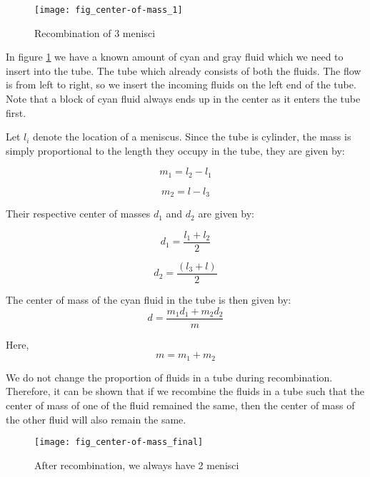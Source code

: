 	\begin{figure}[H]
		\centering
		\texttt{[image: fig\_center-of-mass\_1]}
		\caption{Recombination of 3 menisci}
		\label{fig_center-of-mass_1}
	\end{figure}
	
	In figure \ref{fig_center-of-mass_1} we have a known amount of cyan and gray fluid which we need to insert into the tube. The tube which already consists of both the fluids. The flow is from left to right, so we insert the incoming fluids on the left end of the tube. Note that a block of cyan fluid always ends up in the center as it enters the tube first.
	
	Let $l_{i}$ denote the location of a meniscus. Since the tube is cylinder, the mass is simply proportional to the length they occupy in the tube, they are given by:
	
	\begin{equation}
		m_1 = l_2 - l_1 
	\end{equation}
	
	\begin{equation}
		m_2 = l - l_3
	\end{equation}
	
	Their respective center of masses $d_1$ and $d_2$ are given by:
	
	\begin{equation}	
		d_1 = \frac{l_1 + l_2}{2}
	\end{equation}
	
	\begin{equation}	
		d_2 = \frac{(l_3 + l)}{2}
	\end{equation}
	
	The center of mass of the cyan fluid in the tube is then given by:
	\begin{equation}
		d = \frac{m_1 d_1 + m_2 d_2}{m}
	\end{equation}
	
	Here,
	\begin{equation}
		m = m_1 + m_2
	\end{equation}
	
	
	We do not change the proportion of fluids in a tube during recombination. Therefore, it can be shown that if we recombine the fluids in a tube such that the center of mass of one of the fluid remained the same, then the center of mass of the other fluid will also remain the same.
	
	\begin{figure}[H]
		\centering
		\texttt{[image: fig\_center-of-mass\_final]}
		\caption{After recombination, we always have 2 menisci}
	\end{figure}
	
